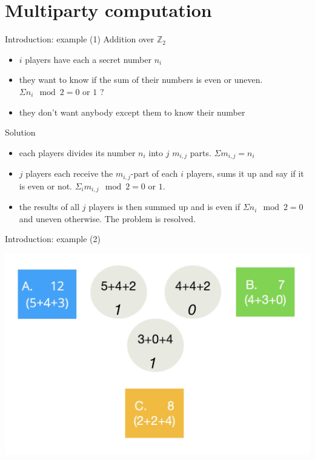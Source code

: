 \documentclass[11pt,t]{beamer}
\begin{document}
\section{Multiparty computation}
\begin{frame}{Introduction: example (1)}
Addition over $\mathbb{Z}_2$
\begin{itemize}
    \item $i$ players have each a secret number $n_i$
    \item they want to know if the sum of their numbers is even or uneven. $\Sigma n_i \mod 2 =0$ or $1$ ?
    \item they don't want anybody except them to know their number
\end{itemize}
\vfill

Solution
\begin{itemize}
    \item each players divides its number $n_i$ into $j$ $m_{i,j}$ parts. $\Sigma m_{i,j} = n_i$
    \item $j$ players each receive the $m_{i,j}$-part of each $i$ players, sums it up and say if it is even or not. $\Sigma_i m_{i,j} \mod 2 = 0$ or $1$.
    \item the results of all $j$ players is then summed up and is even if $\Sigma n_i \mod 2 =0$ and uneven otherwise. The problem is resolved.
\end{itemize}

\end{frame}
\begin{frame}{Introduction: example (2)}
\begin{center}
	\includegraphics[width=\textwidth]{mpc}
\end{center}
\end{frame}
\end{document}
